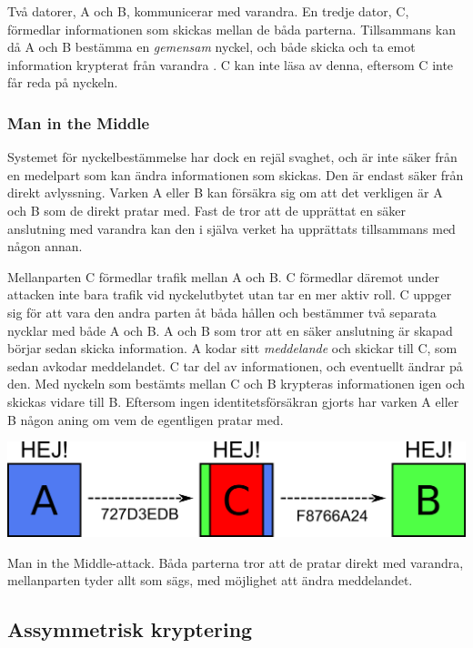 \documentclass{article}
\begin{document}
		Två datorer, A och B, kommunicerar med varandra. En tredje dator, C, förmedlar informationen som skickas mellan de båda parterna. Tillsammans kan då A och B bestämma en \emph{gemensam} nyckel, och både skicka och ta emot information krypterat från varandra \cite{applied-12-6}. C kan inte läsa av denna, eftersom C inte får reda på nyckeln.

		\subsubsection {Man in the Middle}

		Systemet för nyckelbestämmelse har dock en rejäl svaghet, och är inte säker från en medelpart som kan ändra informationen som skickas. Den är endast säker från direkt avlyssning. Varken A eller B kan försäkra sig om att det verkligen är A och B som de direkt pratar med. Fast de tror att de upprättat en säker anslutning med varandra kan den i själva verket ha upprättats tillsammans med någon annan.

		Mellanparten C förmedlar trafik mellan A och B. C förmedlar däremot under attacken inte bara trafik vid nyckelutbytet utan tar en mer aktiv roll. C uppger sig för att vara den andra parten åt båda hållen och bestämmer två separata nycklar med både A och B. A och B som tror att en säker anslutning är skapad börjar sedan skicka information. A kodar sitt \emph{meddelande} och skickar till C, som sedan avkodar meddelandet. C tar del av informationen, och eventuellt ändrar på den. Med nyckeln som bestämts mellan C och B krypteras informationen igen och skickas vidare till B. Eftersom ingen identitetsförsäkran gjorts har varken A eller B någon aning om vem de egentligen pratar med.\newline

\begin{center}
\includegraphics[width=\textwidth]{janus}

Man in the Middle-attack. Båda parterna tror att de pratar direkt med varandra, mellanparten tyder allt som sägs, med möjlighet att ändra meddelandet.\newline
\end{center}

	\subsection {Assymmetrisk kryptering}
\end{document}
